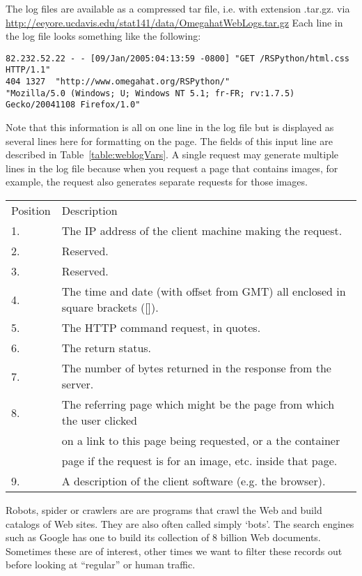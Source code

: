 The log files are available as a compressed tar file, i.e. with 
extension .tar.gz. via \\
\url{http://eeyore.ucdavis.edu/stat141/data/OmegahatWebLogs.tar.gz}
Each line in the log file looks something like the following:
{\footnotesize{
\begin{verbatim}
82.232.52.22 - - [09/Jan/2005:04:13:59 -0800] "GET /RSPython/html.css HTTP/1.1" 
404 1327  "http://www.omegahat.org/RSPython/"
"Mozilla/5.0 (Windows; U; Windows NT 5.1; fr-FR; rv:1.7.5) Gecko/20041108 Firefox/1.0"
\end{verbatim}
}}
Note that this information is all on one line in the log file but is displayed as
  several lines here for formatting on the page.
The fields of this input line are described in
Table~\ref{table:weblogVars}. 
A single request may generate multiple lines in the log
file because when you request a page that contains images, for 
example, the request also generates separate requests for those images.


\begin{table}
\begin{tabular}{ll}
Position & Description \\
1. & The IP address of the client machine making the request. \\
2. & Reserved. \\
3. & Reserved. \\
4. & The time and date (with offset from GMT) all enclosed in square
  brackets ([]).\\
5. & The HTTP command request, in quotes. \\
6. & The return status. \\
7. & The number of bytes returned in the response from the server. \\
8. & The referring page which might be the page from which the user
  clicked\\
   &  on a link to this page being requested, or a the container\\
   & page if the request is for an image, etc. inside that page. \\
9. & A description of the client software (e.g. the browser).\\
\end{tabular}
\end{table}


Robots, spider or crawlers are are programs that crawl the Web and
build catalogs of Web sites. They are also often called simply `bots'.
The search engines such as Google has one to build its collection of 8
billion Web documents.  Sometimes these are of interest, other times
we want to filter these records out before looking at ``regular'' or
human traffic.

